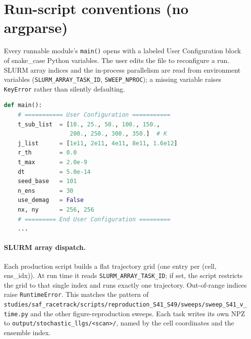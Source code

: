 \documentclass[11pt,a4paper]{article}
\begin{document}
\section{Run-script conventions (no argparse)}

Every runnable module's \texttt{main()} opens with a labeled User
Configuration block of snake\_case Python variables. The user edits
the file to reconfigure a run. SLURM array indices and the in-process
parallelism are read from environment variables
(\texttt{SLURM\_ARRAY\_TASK\_ID}, \texttt{SWEEP\_NPROC}); a missing
variable raises \texttt{KeyError} rather than silently defaulting.

\begin{lstlisting}[language=python]
def main():
    # =========== User Configuration ===========
    t_sub_list  = [10., 25., 50., 100., 150.,
                   200., 250., 300., 350.]  # K
    j_list      = [1e11, 2e11, 4e11, 8e11, 1.6e12]
    r_th        = 0.0
    t_max       = 2.0e-9
    dt          = 5.0e-14
    seed_base   = 101
    n_ens       = 30
    use_demag   = False
    nx, ny      = 256, 256
    # ========= End User Configuration =========
    ...
\end{lstlisting}

\paragraph{SLURM array dispatch.} Each production script builds a
flat trajectory grid (one entry per (cell, ens\_idx)). At run time
it reads \texttt{SLURM\_ARRAY\_TASK\_ID}; if set, the script
restricts the grid to that single index and runs exactly one
trajectory. Out-of-range indices raise \texttt{RuntimeError}. This
matches the pattern of \texttt{studies/saf\_racetrack/scripts/reproduction\_S41\_S49/sweeps/sweep\_S41\_v\_time.py} and
the other figure-reproduction sweeps. Each task writes its own
NPZ to \texttt{output/stochastic\_llgs/<scan>/}, named by the cell
coordinates and the ensemble index.
\end{document}
